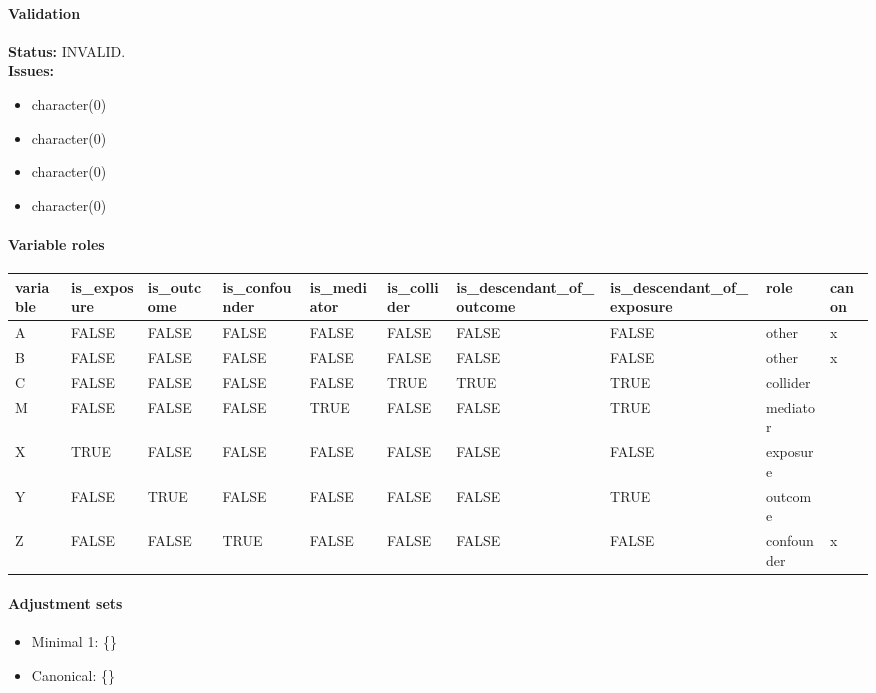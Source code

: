 \begingroup\small
\paragraph{Validation}
\textbf{Status:} INVALID.
\\[2pt]\textbf{Issues:}
\begin{itemize}
  \item character(0)
  \item character(0)
  \item character(0)
  \item character(0)
\end{itemize}

\paragraph{Variable roles}
\begin{tabular}{@{ }l l l l l l l l l l@{ }}
\hline
variable & is\_exposure & is\_outcome & is\_confounder & is\_mediator & is\_collider & is\_descendant\_of\_outcome & is\_descendant\_of\_exposure & role & canon \\
\hline
A & FALSE & FALSE & FALSE & FALSE & FALSE & FALSE & FALSE & other & x \\
B & FALSE & FALSE & FALSE & FALSE & FALSE & FALSE & FALSE & other & x \\
C & FALSE & FALSE & FALSE & FALSE & TRUE & TRUE & TRUE & collider &  \\
M & FALSE & FALSE & FALSE & TRUE & FALSE & FALSE & TRUE & mediator &  \\
X & TRUE & FALSE & FALSE & FALSE & FALSE & FALSE & FALSE & exposure &  \\
Y & FALSE & TRUE & FALSE & FALSE & FALSE & FALSE & TRUE & outcome &  \\
Z & FALSE & FALSE & TRUE & FALSE & FALSE & FALSE & FALSE & confounder & x \\
\hline
\end{tabular}

\paragraph{Adjustment sets}
\begin{itemize}
  \item Minimal 1: \{\}
  \item Canonical: \{\}
\end{itemize}

\endgroup
